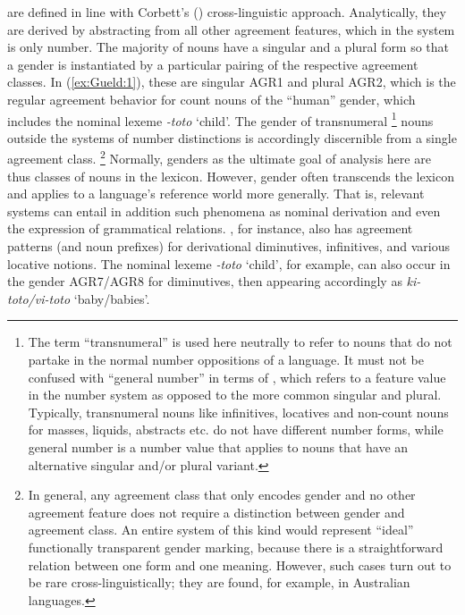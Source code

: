 \documentclass[output=collectionpaper]{langsci/langscibook}
\begin{document}
 are defined in line with Corbett's (\citeyear{Corbett1991}) cross-linguistic approach. Analytically, they are derived by abstracting from all other agreement features, which in the  system is only number. The majority of  nouns have a singular and a plural form so that a gender is instantiated by a particular pairing of the respective agreement classes. In (\ref{ex:Gueld:1}), these are singular AGR1 and plural AGR2, which is the regular agreement behavior for count nouns of the ``human'' gender, which includes the nominal lexeme \textit{{}-toto} `child'. The gender of transnumeral%
\footnote{The term ``transnumeral'' is used here neutrally to refer to nouns that do not partake in the normal number oppositions of a language. It must not be confused with ``general number'' in terms of \citet[9--19]{Corbett2000}, which refers to a feature value in the number system as opposed to the more common singular and plural. Typically, transnumeral nouns like infinitives, locatives and non-count nouns for masses, liquids, abstracts etc. do not have different number forms, while general number is a number value that applies to nouns that have an alternative singular and/or plural variant.%
} %
nouns outside the systems of number distinctions is accordingly discernible from a single agreement class.%
\footnote{In general, any agreement class that only encodes gender and no other agreement feature does not require a distinction between gender and agreement class. An entire system of this kind would represent ``ideal'' functionally transparent gender marking, because there is a straightforward relation between one form and one meaning. However, such cases turn out to be rare cross-linguistically; they are found, for example, in Australian languages.} %
Normally, genders as the ultimate goal of analysis here are thus classes of nouns in the lexicon. However, gender often transcends the lexicon and applies to a language's reference world more generally. That is, relevant systems can entail in addition such phenomena as nominal derivation and even the expression of grammatical relations. , for instance, also has agreement patterns (and noun prefixes) for derivational diminutives, infinitives, and various locative notions. The nominal lexeme \textit{{}-toto} `child', for example, can also occur in the gender AGR7/AGR8 for diminutives, then appearing accordingly as \textit{ki-toto/vi-toto} `baby/babies'.
\end{document}
